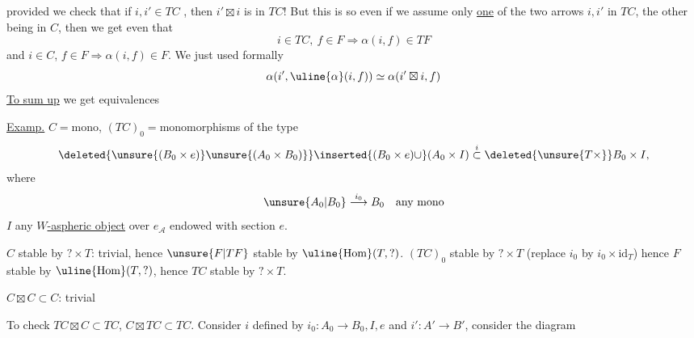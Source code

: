 provided we check that if $i,i'\in TC$ , then $i'\boxtimes i$ is in $TC$! 
But  this is so even if we assume only \uline{one} of the two arrows $i,i'$ in $TC$, the other being in $C$, then we get even that
\[
i\in TC,\ f\in F\Longrightarrow\alpha(i,f)\in TF
\]
and $i\in C$, $f\in F\Rightarrow\alpha(i,f)\in F$.
We just used formally
\[
\alpha(i',\uline{\alpha}(i,f))\simeq\alpha(i'\boxtimes i,f)
\]
\uline{To sum up} we get equivalences

\uline{Examp.} 
 $C={}$mono, $(TC)_0={}$monomorphisms of the type
\[
\deleted{\unsure{(B_0\times e)}\unsure{(A_0\times B_0)}}\inserted{(B_0\times e)\cup}(A_0\times I)\overset{i}{\subset}\deleted{\unsure{T\times}}B_0\times I,
\]
where
\[
\unsure{A_0|B_0}\overset{i_0}{\longrightarrow}B_0\quad\text{any mono}
\]
$I$ any \uline{$W$-aspheric object} over $e_{\mathcal A}$ endowed with section $e$.

$C$ stable by $?\times T$: trivial, hence $\unsure{F|TF}$ stable by $\uline{\mathrm{Hom}}(T,?)$.
$(TC)_0$ stable by $?\times T$ (replace $i_0$ by $i_0\times\mathrm{id}_T$) hence $F$ stable by $\uline{\mathrm{Hom}}(T,?)$, hence $TC$ stable by $?\times T$.

$C\boxtimes C\subset C$: trivial

To check $TC\boxtimes C\subset TC$, $C\boxtimes TC\subset TC$. Consider $i$ defined by $i_0\colon A_0\to B_0,I,e$  and $i'\colon A'\to B'$, consider the diagram


